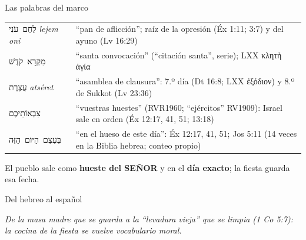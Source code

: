 \documentclass[hyperref={bookmarks=false},aspectratio=169]{beamer}
\newcommand{\heb}[1]{\mbox{\foreignlanguage{hebrew}{#1}}}
\newcommand{\grc}[1]{\foreignlanguage{ancientgreek}{#1}}
\newcommand{\SENOR}{S{\fontsize{0.78em}{1em}\selectfont EÑOR}}
\newcommand{\destacar}[1]{\textbf{\textcolor{tierraroja}{#1}}}
\begin{document}
\begin{frame}{Las palabras del marco}
\scriptsize\renewcommand{\arraystretch}{1.15}
\begin{tabular}{@{}L{2.7cm}L{9.3cm}@{}}
\toprule
\heb{לֶחֶם עֹנִי} \emph{lejem oni} & ``pan de aflicción''; raíz de la opresión (Éx 1:11; 3:7) y del ayuno (Lv 16:29) \\
\heb{מִקְרָא קֹדֶשׁ} & ``santa convocación'' (``citación santa'', serie); LXX \grc{κλητὴ ἁγία} \\
\heb{עֲצֶרֶת} \emph{atséret} & ``asamblea de clausura'': 7.º día (Dt 16:8; LXX \grc{ἐξόδιον}) y 8.º de Sukkot (Lv 23:36) \\
\heb{צִבְאוֹתֵיכֶם} & ``vuestras huestes'' (RVR1960; ``ejércitos'' RV1909): Israel sale en orden (Éx 12:17, 41, 51; 13:18) \\
\heb{בְּעֶצֶם הַיּוֹם הַזֶּה} & ``en el hueso de este día'': Éx 12:17, 41, 51; Jos 5:11 (14 veces en la Biblia hebrea; conteo propio) \\
\bottomrule
\end{tabular}\par\medskip
\small El pueblo sale como \destacar{hueste del \SENOR} y en el \destacar{día exacto}; la fiesta guarda esa fecha.
\end{frame}

\begin{frame}{Del hebreo al español}
\centering
{}\par\medskip
\small\itshape\color{sepia} De la masa madre que se guarda a la ``levadura vieja'' que se limpia (1 Co 5:7): la cocina de la fiesta se vuelve vocabulario moral.
\end{frame}
\end{document}
